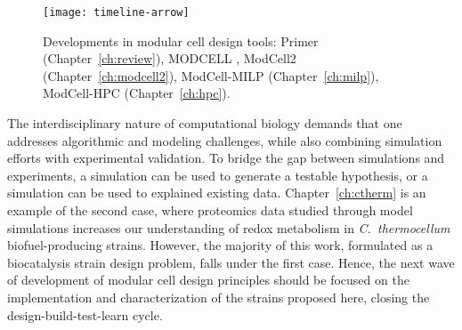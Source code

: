 \begin{figure}[h]
  \centering
  \texttt{[image: timeline-arrow]}
    \caption[Developments in modular cell design tools]{Developments in modular cell design tools: Primer (Chapter~\ref{ch:review}), MODCELL \citep{trinh2015}, ModCell2 (Chapter~\ref{ch:modcell2}), ModCell-MILP (Chapter~\ref{ch:milp}), ModCell-HPC (Chapter~\ref{ch:hpc}).}
    \label{fig8:arrow}
\end{figure}



The interdisciplinary nature of computational biology demands that one addresses algorithmic and modeling challenges, while also combining simulation efforts with experimental validation.
To bridge the gap between simulations and experiments, a simulation can be used to generate a testable hypothesis, or a simulation can be used to explained existing data.
Chapter~\ref{ch:ctherm} is an example of the second case, where proteomics data studied through model simulations increases our understanding of redox metabolism in \textit{C.~thermocellum} biofuel-producing strains.
However, the majority of this work, formulated as a biocatalysis strain design problem, falls under the first case.
Hence, the next wave of development of modular cell design principles should be focused on the implementation and characterization of the strains proposed here, closing the design-build-test-learn cycle.




